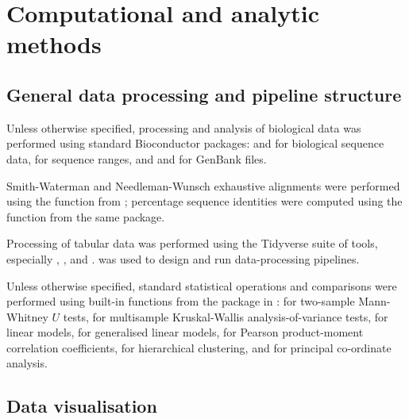 \section{Computational and analytic methods}
\label{sec:methods_comp}

\subsection{General data processing and pipeline structure}
\label{sec:methods_comp_general}

Unless otherwise specified, processing and analysis of biological data was performed using standard Bioconductor \parencite{huber2015bioconductor} packages:  \parencite{pages2017biostrings} and  \parencite{pages2018bsgenome} for biological sequence data,  \parencite{lawrence2013genomicranges} for sequence ranges, and  \parencite{becker2018genbankr} and  \parencite{winter2017rentrez} for GenBank files. 

Smith-Waterman and Needleman-Wunsch exhaustive alignments \parencite{needleman1970alignment,waterman1981alignment} were performed using the  function from ; percentage sequence identities were computed using the  function from the same package.

Processing of tabular data was performed using the Tidyverse suite of tools, especially  \parencite{wickham2018readr},  \parencite{wickham2018dplyr},  \parencite{wickham2018tidyr} and  \parencite{wickham2018stringr}.  \parencite{koster2012snakemake} was used to design and run data-processing pipelines.

Unless otherwise specified, standard statistical operations and comparisons were performed using built-in functions from the  package in  \parencite{rcore2018rcore}:  for two-sample Mann-Whitney $U$ tests,  for multisample Kruskal-Wallis analysis-of-variance tests,  for linear models,  for generalised linear models,  for Pearson product-moment correlation coefficients,  for hierarchical clustering, and  for principal co-ordinate analysis.

\subsection{Data visualisation}
\label{sec:methods_comp_visualisation}

